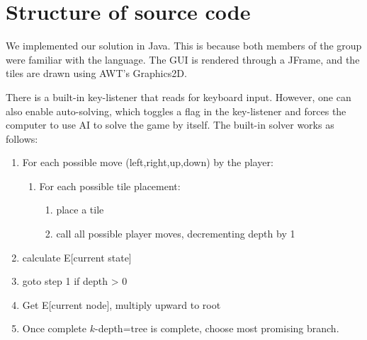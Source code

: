 \documentclass[journal]{IEEEtran}
\begin{document}
\section*{Structure of source code}
We implemented our solution in Java. This is because both members of the group
were familiar with the language. The GUI is rendered through a JFrame, and the tiles are
drawn using AWT's Graphics2D.

There is a built-in key-listener that reads for keyboard input. However, one can also
enable auto-solving, which toggles a flag in the key-listener and forces the computer
to use AI to solve the game by itself. The built-in solver works as follows:
\begin{framed}
\begin{enumerate}
    \item For each possible move (left,right,up,down) by the player:
    \begin{enumerate}
    \item For each possible tile placement:
        \begin{enumerate}
            \item place a tile
            \item call all possible player moves,
                decrementing depth by 1
        \end{enumerate}
    \end{enumerate}
    \item calculate E[current state]
    \item \dotso{} goto step 1 if depth \textgreater{} 0
    \item Get E[current node], multiply upward to root
    \item Once complete $k$-depth=tree is complete, choose most promising branch.
\end{enumerate}
\end{framed}
\end{document}
